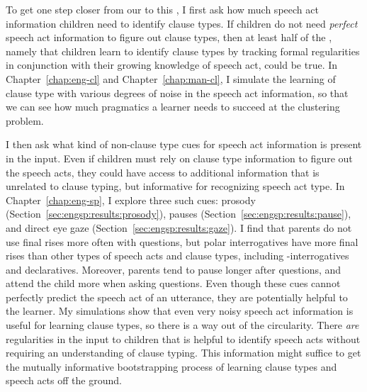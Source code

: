 To get one step closer from our \subhypos{} to this \tbf{\hypos{}}, I first ask how much speech act information children need to identify clause types. If children do not need \emph{perfect} speech act information to figure out clause types, then at least half of the \hypos{}, namely that children learn to identify clause types by tracking formal regularities in conjunction with their growing
knowledge of speech act, could be true. 
In Chapter~\ref{chap:eng-cl} and Chapter~\ref{chap:man-cl}, I simulate the learning of clause type with various degrees of noise in the speech act information, so that we can see how much pragmatics a learner needs to succeed at the clustering problem. 

I then %
ask what kind of non-clause type cues for speech act information is present in the input. Even if children must rely on clause type information to figure out the speech acts, they could have access to additional information that is unrelated to clause typing, but informative for recognizing speech act type. In Chapter~\ref{chap:eng-sp}, I explore three such cues: prosody (Section~\ref{sec:engsp:results:prosody}), pauses (Section~\ref{sec:engsp:results:pause}), and direct eye gaze (Section~\ref{sec:engsp:results:gaze}). I find that parents do not use final rises more often with questions, but polar interrogatives have more final rises than other types of speech acts and clause types, including \twh-interrogatives and declaratives. Moreover, parents tend to pause longer after questions, and attend the child more when asking questions.  Even though these cues cannot perfectly predict the speech act of an utterance, they are potentially helpful to the learner. My simulations show that even very noisy speech act information is useful for learning clause types, so there is a way out of the circularity. There \emph{are} regularities in the input to children that is helpful to identify speech acts without requiring an understanding of clause typing. This information might suffice to get the mutually informative bootstrapping process of learning clause types and speech acts off the ground.

